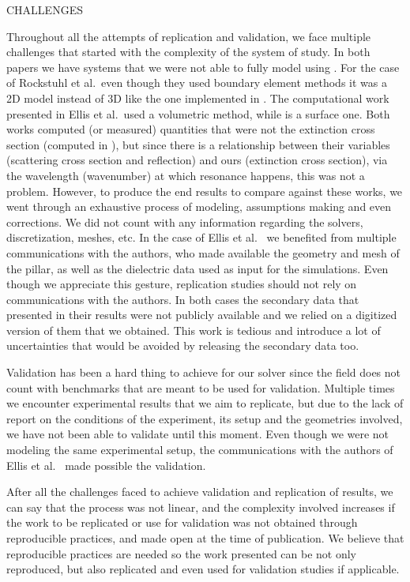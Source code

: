 CHALLENGES 

Throughout all the attempts of replication and validation, we face multiple challenges that started with the complexity of the system of study. In both papers we have systems that we were not able to fully 
model using \pygbe. For the case of Rockstuhl et al.\ even though they used boundary element methods it was a 2D model instead of 3D like the one implemented in \pygbe. The computational work presented in Ellis et al.\ used a volumetric 
method, while \pygbe is a surface one. Both works computed (or measured) quantities that were not the extinction cross section (computed in \pygbe), but since there is a relationship between their variables (scattering cross section and reflection)  
and ours (extinction cross section), via the wavelength (wavenumber) at which resonance happens, this was not a problem. However, to produce the end results to compare against these works, we went through an 
exhaustive process of modeling, assumptions making and even corrections. We did not count with any information regarding the solvers, discretization, meshes, etc. In the case of Ellis et al. \ we benefited from multiple communications with the authors, 
who made available the geometry and mesh of the pillar, as well as the dielectric data used as input for the simulations. Even though we appreciate this gesture, replication studies should not rely on communications with the authors. 
In both cases the secondary data that presented in their results were not publicly available and we relied on a digitized version of them that we obtained. This work is tedious and introduce a lot of uncertainties that would be avoided by releasing 
the secondary data too.

Validation has been a hard thing to achieve for our solver since the field does not count with benchmarks that are meant to be used for validation. Multiple times
we encounter experimental results that we aim to replicate, but due to the lack of report on the conditions of the experiment, its setup and the geometries involved, 
we have not been able to validate until this moment. Even though we were not modeling the same experimental setup, the communications with the authors of Ellis et al. \ made 
possible the validation.

After all the challenges faced to achieve validation and replication of results, we can say that the process was not linear, 
and the complexity involved increases if the work to be replicated or use for validation was not obtained through reproducible practices, and made open at the time 
of publication. We believe that reproducible practices are needed so the work presented can be not only reproduced, but also 
replicated and even used for validation studies if applicable.
